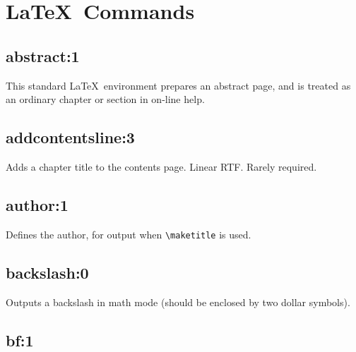 \section{\LaTeX\ Commands}

\subsection*{abstract:1}\label{abstract}

This standard \LaTeX\ environment prepares an abstract page, and is
treated as an ordinary chapter or section in on-line help.

\subsection*{addcontentsline:3}\label{addcontentsline}

Adds a chapter title to the contents page. Linear RTF. Rarely required.

\subsection*{author:1}\label{author}

Defines the author, for output when \verb$\maketitle$ is used.

\subsection*{backslash:0}\label{backslash}

Outputs a backslash in math mode (should be enclosed by two dollar symbols).

\subsection*{bf:1}\label{bf}

